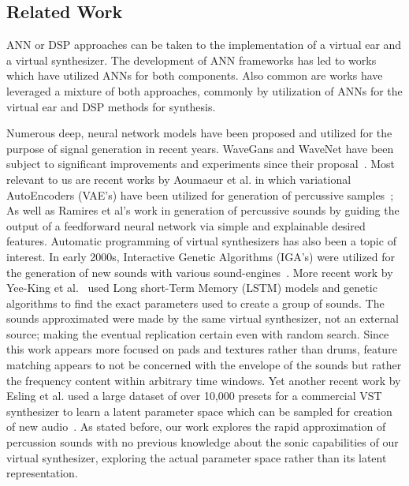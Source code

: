 \documentclass[runningheads,a4paper]{llncs}
\begin{document}
\subsection{Related Work}
ANN or DSP approaches can be taken to the implementation of a virtual ear and a virtual synthesizer. The development of ANN frameworks has led to works which have utilized ANNs for both components. Also common are works have leveraged a mixture of both approaches, commonly by utilization of ANNs for the virtual ear and DSP methods for synthesis.

\begin{center}
\begin{table}[h*]
\caption{for reference, will delete} %
\end{table}
\end{center}
Numerous deep, neural network models have been proposed and utilized for the purpose of signal generation in recent years. WaveGans and WaveNet have been subject to significant improvements and experiments since their proposal~\cite{nsynth2017,yamamoto2020parallel,oord2017parallel}. Most relevant to us are recent works by Aoumaeur et al. in which variational AutoEncoders (VAE's) have been utilized for generation of percussive samples~\cite{aouameur2019neural}; As well as Ramires et al's work in generation of percussive sounds by guiding the output of a feedforward neural network via simple and explainable desired features. 
Automatic programming of virtual synthesizers has also been a topic of interest. In early 2000s, Interactive Genetic Algorithms (IGA's) were utilized for the generation of new sounds with various sound-engines~\cite{johnson1999exploring,dahlstedt2001creating}. More recent work by Yee-King et al.~\cite{yee2018automatic} used Long short-Term Memory (LSTM) models and genetic algorithms to find the exact parameters used to create a group of sounds. The sounds approximated were made by the same virtual synthesizer, not an external source; making the eventual replication certain even with random search. Since this work appears more focused on pads and textures rather than drums, feature matching appears to not be concerned with the envelope of the sounds but rather the frequency content within arbitrary time windows. Yet another recent work by Esling et al. used a large dataset of over 10,000 presets for a commercial VST synthesizer to learn a latent parameter space which can be sampled for creation of new audio~\cite{esling2019universal}. As stated before, our work explores the rapid approximation of percussion sounds with no previous knowledge about the sonic capabilities of our virtual synthesizer, exploring the actual parameter space rather than its latent representation.




\end{document}
